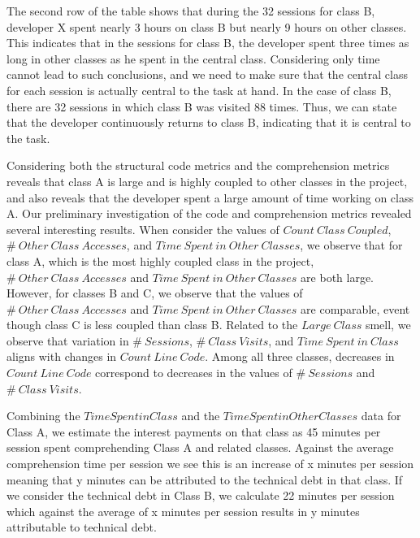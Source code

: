 The second row of the table shows that during the 32 sessions for class B, developer X spent nearly 3 hours on class B but nearly 9 hours on other classes. This indicates that in the sessions for class B, the developer spent three times as long in other classes as he spent in the central class. Considering only time cannot lead to such conclusions, and we need to make sure that the central class for each session is actually central to the task at hand. In the case of class B, there are 32 sessions in which class B was visited 88 times. Thus, we can state that the developer continuously returns to class B, indicating that it is central to the task. 


Considering both the structural code metrics and the comprehension metrics reveals that class A is large and is highly coupled to other classes in the project, and also reveals that the developer spent a large amount of time working on class A. Our preliminary investigation of the code and comprehension metrics revealed several interesting results. When consider the values of $Count~Class~Coupled$, $\#~Other~Class~Accesses$, and $Time~Spent~in~Other~Classes$, we observe that for class A, which is the most highly coupled class in the project, $\#~Other~Class~Accesses$ and $Time~Spent~in~Other~Classes$ are both large. However, for classes B and C, we observe that the values of $\#~Other~Class~Accesses$ and $Time~Spent~in~Other~Classes$ are comparable, event though class C is less coupled than class B. Related to the $Large~Class$ smell, we observe that variation in $\#~Sessions$, $\#~Class~Visits$, and $Time~Spent~in~Class$ aligns with changes in $Count~Line~Code$. Among all three classes, decreases in $Count~Line~Code$ correspond to decreases in the values of $\#~Sessions$ and $\#~Class~Visits$. 


Combining the $Time Spent in Class$ and the $Time Spent in Other Classes$ data for Class A, we estimate the interest payments on that class as 45 minutes per session spent comprehending Class A and related classes.  Against the average comprehension time per session we see this is an increase of x minutes per session meaning that y minutes can be attributed to the technical debt in that class.  If we consider the technical debt in Class B, we calculate 22 minutes per session which against the average of x minutes per session results in y minutes attributable to technical debt.
